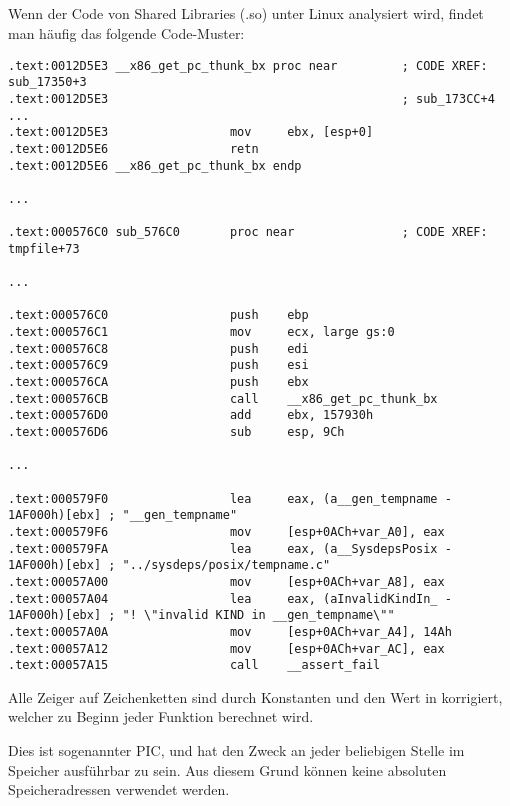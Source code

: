 \subsection{\CapitalPICcode}
\myindex{\PICcode}
\label{sec:PIC}

Wenn der Code von Shared Libraries (.so) unter Linux analysiert wird, findet
man häufig das folgende Code-Muster:

\begin{lstlisting}[caption=libc-2.17.so x86]
.text:0012D5E3 __x86_get_pc_thunk_bx proc near         ; CODE XREF: sub_17350+3
.text:0012D5E3                                         ; sub_173CC+4 ...
.text:0012D5E3                 mov     ebx, [esp+0]
.text:0012D5E6                 retn
.text:0012D5E6 __x86_get_pc_thunk_bx endp

...

.text:000576C0 sub_576C0       proc near               ; CODE XREF: tmpfile+73

...

.text:000576C0                 push    ebp
.text:000576C1                 mov     ecx, large gs:0
.text:000576C8                 push    edi
.text:000576C9                 push    esi
.text:000576CA                 push    ebx
.text:000576CB                 call    __x86_get_pc_thunk_bx
.text:000576D0                 add     ebx, 157930h
.text:000576D6                 sub     esp, 9Ch

...

.text:000579F0                 lea     eax, (a__gen_tempname - 1AF000h)[ebx] ; "__gen_tempname"
.text:000579F6                 mov     [esp+0ACh+var_A0], eax
.text:000579FA                 lea     eax, (a__SysdepsPosix - 1AF000h)[ebx] ; "../sysdeps/posix/tempname.c"
.text:00057A00                 mov     [esp+0ACh+var_A8], eax
.text:00057A04                 lea     eax, (aInvalidKindIn_ - 1AF000h)[ebx] ; "! \"invalid KIND in __gen_tempname\""
.text:00057A0A                 mov     [esp+0ACh+var_A4], 14Ah
.text:00057A12                 mov     [esp+0ACh+var_AC], eax
.text:00057A15                 call    __assert_fail
\end{lstlisting}

Alle Zeiger auf Zeichenketten sind durch Konstanten und den Wert in \EBX korrigiert,
welcher zu Beginn jeder Funktion berechnet wird.

Dies ist sogenannter \ac{PIC}, und hat den Zweck an jeder beliebigen Stelle im Speicher
ausführbar zu sein. Aus diesem Grund können keine absoluten Speicheradressen verwendet werden.

